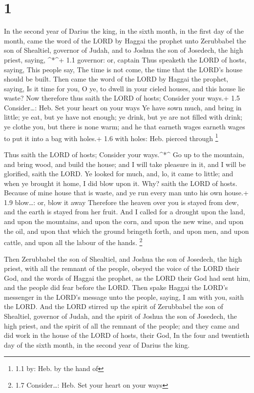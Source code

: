 \hypertarget{section}{%
\section{1}\label{section}}

 In the second year of Darius the king, in the sixth month,
in the first day of the month, came the word of the LORD by Haggai the
prophet unto Zerubbabel the son of Shealtiel, governor of Judah, and to
Joshua the son of Josedech, the high priest, saying, \^{}*\^{}+ 1.1
governor: or, captain  Thus speaketh the LORD of hosts,
saying, This people say, The time is not come, the time that the LORD's
house should be built.  Then came the word of the LORD by
Haggai the prophet, saying,  Is it time for you, O ye, to
dwell in your cieled houses, and this house lie waste?  Now
therefore thus saith the LORD of hosts; Consider your ways.+ 1.5
Consider\ldots: Heb. Set your heart on your ways  Ye have
sown much, and bring in little; ye eat, but ye have not enough; ye
drink, but ye are not filled with drink; ye clothe you, but there is
none warm; and he that earneth wages earneth wages to put it into a bag
with holes.+ 1.6 with holes: Heb. pierced through \footnote{1.1 by: Heb.
  by the hand of}

 Thus saith the LORD of hosts; Consider your ways.\^{}*\^{}
 Go up to the mountain, and bring wood, and build the house;
and I will take pleasure in it, and I will be glorified, saith the LORD.
 Ye looked for much, and, lo, it came to little; and when ye
brought it home, I did blow upon it. Why? saith the LORD of hosts.
Because of mine house that is waste, and ye run every man unto his own
house.+ 1.9 blow\ldots: or, blow it away  Therefore the
heaven over you is stayed from dew, and the earth is stayed from her
fruit.  And I called for a drought upon the land, and upon
the mountains, and upon the corn, and upon the new wine, and upon the
oil, and upon that which the ground bringeth forth, and upon men, and
upon cattle, and upon all the labour of the hands. \footnote{1.7
  Consider\ldots: Heb. Set your heart on your ways}

 Then Zerubbabel the son of Shealtiel, and Joshua the son
of Josedech, the high priest, with all the remnant of the people, obeyed
the voice of the LORD their God, and the words of Haggai the prophet, as
the LORD their God had sent him, and the people did fear before the
LORD.  Then spake Haggai the LORD's messenger in the LORD's
message unto the people, saying, I am with you, saith the LORD.
 And the LORD stirred up the spirit of Zerubbabel the son
of Shealtiel, governor of Judah, and the spirit of Joshua the son of
Josedech, the high priest, and the spirit of all the remnant of the
people; and they came and did work in the house of the LORD of hosts,
their God,  In the four and twentieth day of the sixth
month, in the second year of Darius the king.

